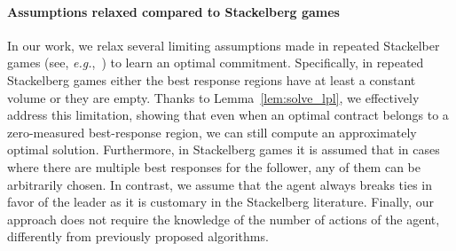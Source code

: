 %
%
\paragraph{Assumptions relaxed compared to Stackelberg games}

In our work, we relax several limiting assumptions made in repeated Stackelber games (see, \emph{e.g.},~\citep{letchford2009learning,Peng2019}) to learn an optimal commitment. Specifically, in repeated Stackelberg games either the best response regions have at least a constant volume or they are empty. Thanks to Lemma~\ref{lem:solve_lpl}, we effectively address this limitation, showing that even when an optimal contract belongs to a zero-measured best-response region, we can still compute an approximately optimal solution. Furthermore, in Stackelberg games it is assumed that in cases where there are multiple best responses for the follower, any of them can be arbitrarily chosen. In contrast, we assume that the agent always breaks ties in favor of the leader as it is customary in the Stackelberg literature. Finally, our approach does not require the knowledge of the number of actions of the agent, differently from previously proposed algorithms.
